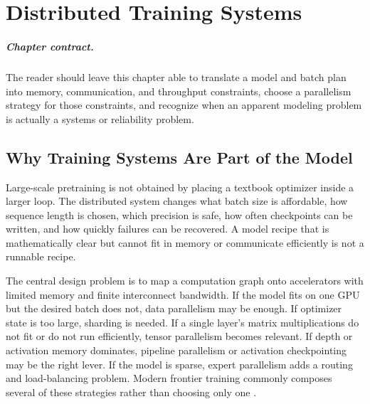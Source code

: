 \chapter{Distributed Training Systems}
\label{ch:distributed-training-systems}


\paragraph{Chapter contract.} The reader should leave this chapter able to translate a model and batch plan into memory, communication, and throughput constraints, choose a parallelism strategy for those constraints, and recognize when an apparent modeling problem is actually a systems or reliability problem.

\section{Why Training Systems Are Part of the Model}
\label{sec:systems-part-of-model}

Large-scale pretraining is not obtained by placing a textbook optimizer inside a larger loop. The distributed system changes what batch size is affordable, how sequence length is chosen, which precision is safe, how often checkpoints can be written, and how quickly failures can be recovered. A model recipe that is mathematically clear but cannot fit in memory or communicate efficiently is not a runnable recipe.

The central design problem is to map a computation graph onto accelerators with limited memory and finite interconnect bandwidth. If the model fits on one GPU but the desired batch does not, data parallelism may be enough. If optimizer state is too large, sharding is needed. If a single layer's matrix multiplications do not fit or do not run efficiently, tensor parallelism becomes relevant. If depth or activation memory dominates, pipeline parallelism or activation checkpointing may be the right lever. If the model is sparse, expert parallelism adds a routing and load-balancing problem. Modern frontier training commonly composes several of these strategies rather than choosing only one \cite{narayanan2021efficient,deepseek2024v3}.

